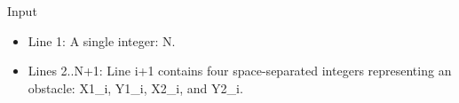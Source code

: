 Input
\begin{itemize}
	\item      Line 1: A single integer: N.    
	\item      Lines 2..N+1: Line i+1 contains four space-separated integers         representing an obstacle: X1\_i, Y1\_i, X2\_i, and Y2\_i.    
\end{itemize}